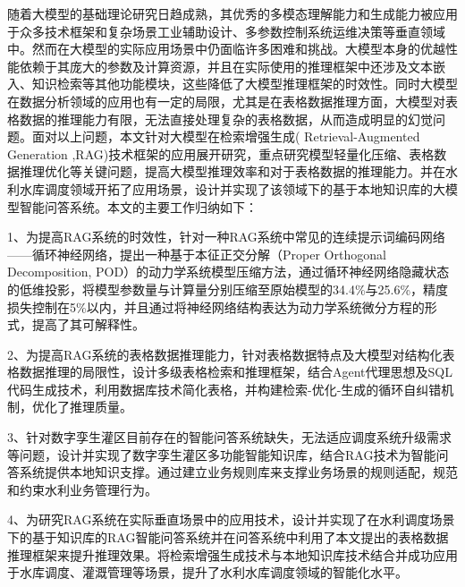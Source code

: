 \begin{cabstract}
    随着大模型的基础理论研究日趋成熟，其优秀的多模态理解能力和生成能力被应用于众多技术框架和复杂场景工业辅助设计、多参数控制系统运维决策等垂直领域中。然而在大模型的实际应用场景中仍面临许多困难和挑战。大模型本身的优越性能依赖于其庞大的参数及计算资源，并且在实际使用的推理框架中还涉及文本嵌入、知识检索等其他功能模块，这些降低了大模型推理框架的时效性。同时大模型在数据分析领域的应用也有一定的局限，尤其是在表格数据推理方面，大模型对表格数据的推理能力有限，无法直接处理复杂的表格数据，从而造成明显的幻觉问题。面对以上问题，本文针对大模型在检索增强生成( Retrieval-Augmented Generation ,RAG)技术框架的应用展开研究，重点研究模型轻量化压缩、表格数据推理优化等关键问题，提高大模型推理效率和对于表格数据的推理能力。并在水利水库调度领域开拓了应用场景，设计并实现了该领域下的基于本地知识库的大模型智能问答系统。本文的主要工作归纳如下： 

    1、为提高RAG系统的时效性，针对一种RAG系统中常见的连续提示词编码网络——循环神经网络，提出一种基于本征正交分解（Proper Orthogonal Decomposition, POD）的动力学系统模型压缩方法，通过循环神经网络隐藏状态的低维投影，将模型参数量与计算量分别压缩至原始模型的34.4\%与25.6\%，精度损失控制在5\%以内，并且通过将神经网络结构表达为动力学系统微分方程的形式，提高了其可解释性。
    
    2、为提高RAG系统的表格数据推理能力，针对表格数据特点及大模型对结构化表格数据推理的局限性，设计多级表格检索和推理框架，结合Agent代理思想及SQL代码生成技术，利用数据库技术简化表格，并构建检索-优化-生成的循环自纠错机制，优化了推理质量。
    
    3、针对数字孪生灌区目前存在的智能问答系统缺失，无法适应调度系统升级需求等问题，设计并实现了数字孪生灌区多功能智能知识库，结合RAG技术为智能问答系统提供本地知识支撑。通过建立业务规则库来支撑业务场景的规则适配，规范和约束水利业务管理行为。

    4、为研究RAG系统在实际垂直场景中的应用技术，设计并实现了在水利调度场景下的基于知识库的RAG智能问答系统并在问答系统中利用了本文提出的表格数据推理框架来提升推理效果。将检索增强生成技术与本地知识库技术结合并成功应用于水库调度、灌溉管理等场景，提升了水利水库调度领域的智能化水平。
    \end{cabstract}
    
    

